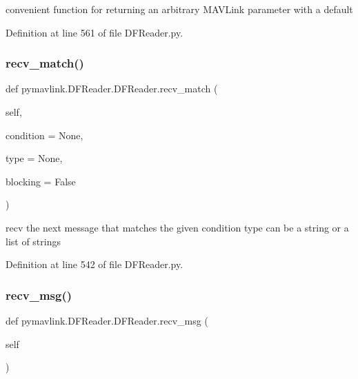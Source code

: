 \begin{DoxyVerb}convenient function for returning an arbitrary MAVLink
   parameter with a default\end{DoxyVerb}
 

Definition at line 561 of file D\+F\+Reader.\+py.

\mbox{\label{classpymavlink_1_1DFReader_1_1DFReader_aa0900449adff0ff0946cc568f83308ed}} 
\subsubsection{\texorpdfstring{recv\_match()}{recv\_match()}}
{\footnotesize\ttfamily def pymavlink.\+D\+F\+Reader.\+D\+F\+Reader.\+recv\+\_\+match (\begin{DoxyParamCaption}\item[{}]{self,  }\item[{}]{condition = {\ttfamily None},  }\item[{}]{type = {\ttfamily None},  }\item[{}]{blocking = {\ttfamily False} }\end{DoxyParamCaption})}

\begin{DoxyVerb}recv the next message that matches the given condition
type can be a string or a list of strings\end{DoxyVerb}
 

Definition at line 542 of file D\+F\+Reader.\+py.

\mbox{\label{classpymavlink_1_1DFReader_1_1DFReader_a7c726e75615d8cc5b2a65fe62ab2f21d}} 
\subsubsection{\texorpdfstring{recv\_msg()}{recv\_msg()}}
{\footnotesize\ttfamily def pymavlink.\+D\+F\+Reader.\+D\+F\+Reader.\+recv\+\_\+msg (\begin{DoxyParamCaption}\item[{}]{self }\end{DoxyParamCaption})}



